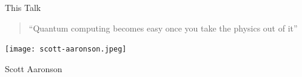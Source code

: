 \begin{frame}{This Talk}
\end{frame}

















\begin{frame}
\vfill


\Large

\begin{quote}
``Quantum computing becomes easy once you take the physics out of it''
\end{quote}
\hfill
\texttt{[image: scott-aaronson.jpeg]}

\hfill Scott Aaronson

\end{frame}





